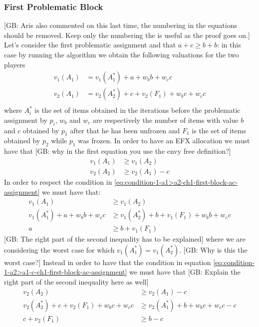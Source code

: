 \documentclass{article}
\newcommand{\gb}[1]{{\color{red}[GB: #1]}}
\begin{document}
\subsubsection{First Problematic Block}
\gb{Aris also commented on this last time, the numbering  in the equations should be removed. Keep only the numbering the is useful as the proof goes on.}
Let's consider the first problematic assignment and that $a + c \ge b + b$: in this case by running the algorithm we obtain the following valuations for the two players
\begin{align}
    v_1(A_1) &= v_1(A_1^*) + a + w_b b + w_c c\\
    v_2(A_1) &= v_2(A_2^*) + c + v_2(F_1)+ w_b c + w_c c\\
\end{align}
where $A_i^*$ is the set of items obtained in the iterations before the problematic assignment by $p_i$, $w_b$ and $w_c$ are respectively the number of items with value $b$ and $c$ obtained by $p_1$ after that he has been unfrozen and $F_1$ is the set of items obtained by $p_2$ while $p_1$ was frozen. In order to have an EFX allocation we must have that 
\gb{why in the first equation you use the envy free definition?}
\begin{align}
    v_1(A_1) &\ge v_1(A_2)\label{eq:condition-1-a1>a2-ch1-first-block-ac-assignment}\\
    v_2(A_2) &\ge v_2(A_1) - c\label{eq:condition-1-a2>a1-c-ch1-first-block-ac-assignment}
\end{align}
In order to respect the condition in \ref{eq:condition-1-a1>a2-ch1-first-block-ac-assignment} we must have that:
\begin{align}
    v_1(A_1) &\ge v_1(A_2)\\
    v_1(A_1^*) + a + w_b b + w_c c &\ge  v_1(A_2^*) + b + v_1(F_1)+ w_b b + w_c c \\
    a  &\ge  b + v_1(F_1)
\end{align}
\gb{The right part of the second inequality has to be explained}
where we are considering the worst case for which $v_1(A_1^*) = v_1(A_2^*)$.
\gb{Why is this the worst case?}
Instead in order to have that the condition in equation \ref{eq:condition-1-a2>a1-c-ch1-first-block-ac-assignment} we must have that
\gb{Explain the right part of the second inequality here as well}
\begin{align}
    v_2(A_2) &\ge v_2(A_1) -c\\
    v_2(A_2^*) + c + v_2(F_1)+ w_b c + w_c c &\ge v_2(A_1^*) + b + w_b c + w_c c - c\\
    c  + v_2(F_1)&\ge  b - c 
\end{align}
\end{document}
